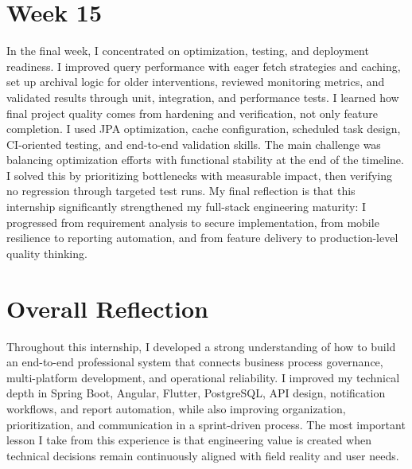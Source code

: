 \section*{Week 15}
In the final week, I concentrated on optimization, testing, and deployment readiness. I improved query performance with eager fetch strategies and caching, set up archival logic for older interventions, reviewed monitoring metrics, and validated results through unit, integration, and performance tests. I learned how final project quality comes from hardening and verification, not only feature completion. I used JPA optimization, cache configuration, scheduled task design, CI-oriented testing, and end-to-end validation skills. The main challenge was balancing optimization efforts with functional stability at the end of the timeline. I solved this by prioritizing bottlenecks with measurable impact, then verifying no regression through targeted test runs. My final reflection is that this internship significantly strengthened my full-stack engineering maturity: I progressed from requirement analysis to secure implementation, from mobile resilience to reporting automation, and from feature delivery to production-level quality thinking.

\section*{Overall Reflection}
Throughout this internship, I developed a strong understanding of how to build an end-to-end professional system that connects business process governance, multi-platform development, and operational reliability. I improved my technical depth in Spring Boot, Angular, Flutter, PostgreSQL, API design, notification workflows, and report automation, while also improving organization, prioritization, and communication in a sprint-driven process. The most important lesson I take from this experience is that engineering value is created when technical decisions remain continuously aligned with field reality and user needs.